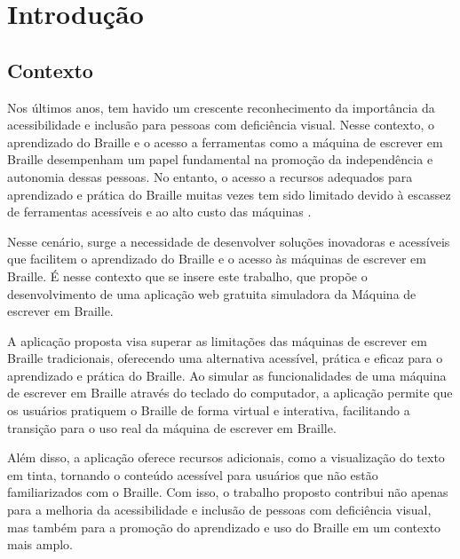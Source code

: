 % 
\chapter{Introdução} %
\label{chap:Chapter01} %
%

\section{Contexto} 
\label{sec:chap01_context} %

Nos últimos anos, tem havido um crescente reconhecimento da importância da acessibilidade e inclusão para pessoas com deficiência visual. Nesse contexto, o aprendizado do Braille e o acesso a ferramentas como a máquina de escrever em Braille desempenham um papel fundamental na promoção da independência e autonomia dessas pessoas. No entanto, o acesso a recursos adequados para aprendizado e prática do Braille muitas vezes tem sido limitado devido à escassez de ferramentas acessíveis e ao alto custo das máquinas \parencite{REF01}.

Nesse cenário, surge a necessidade de desenvolver soluções inovadoras e acessíveis que facilitem o aprendizado do Braille e o acesso às máquinas de escrever em Braille. É nesse contexto que se insere este trabalho, que propõe o desenvolvimento de uma aplicação web gratuita simuladora da Máquina de escrever em Braille.

A aplicação proposta visa superar as limitações das máquinas de escrever em Braille tradicionais, oferecendo uma alternativa acessível, prática e eficaz para o aprendizado e prática do Braille. Ao simular as funcionalidades de uma máquina de escrever em Braille através do teclado do computador, a aplicação permite que os usuários pratiquem o Braille de forma virtual e interativa, facilitando a transição para o uso real da máquina de escrever em Braille.

Além disso, a aplicação oferece recursos adicionais, como a visualização do texto em tinta, tornando o conteúdo acessível para usuários que não estão familiarizados com o Braille. Com isso, o trabalho proposto contribui não apenas para a melhoria da acessibilidade e inclusão de pessoas com deficiência visual, mas também para a promoção do aprendizado e uso do Braille em um contexto mais amplo.

